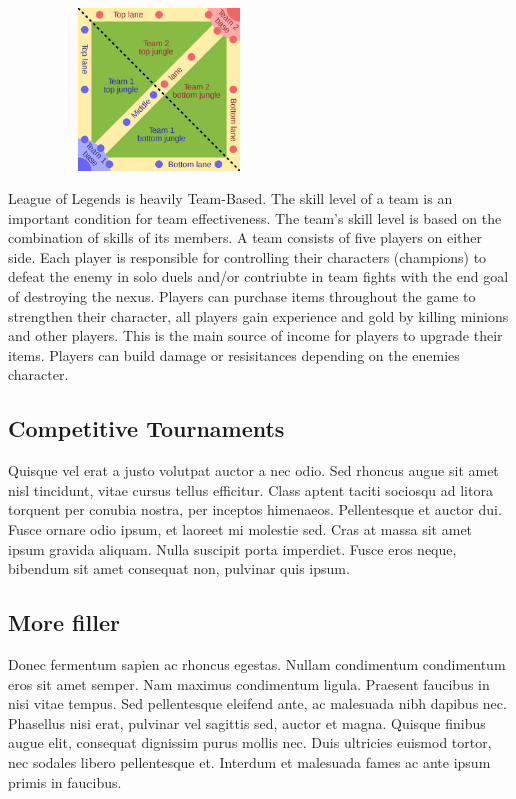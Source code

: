 \begin{center}    
	\includegraphics[width=8cm,height=4.3cm,keepaspectratio]{img/Map.png}
\end{center}
\clearpage

League of Legends is heavily Team-Based. The skill level of a team is an important condition for team effectiveness. The team's skill level is based on the combination of skills of its members.
A team consists of five players on either side. Each player is responsible for controlling their characters (champions) to defeat the enemy in solo duels and/or contriubte in team fights with the end goal of destroying the nexus. Players can purchase items throughout the game to strengthen their character, all players gain experience and gold by killing minions and other players. This is the main source of income for players to upgrade their items. Players can build damage or resisitances depending on the enemies character.

\subsection{Competitive Tournaments}
Quisque vel erat a justo volutpat auctor a nec odio. Sed rhoncus augue sit amet nisl tincidunt, vitae cursus tellus efficitur. Class aptent taciti sociosqu ad litora torquent per conubia nostra, per inceptos himenaeos. Pellentesque et auctor dui. Fusce ornare odio ipsum, et laoreet mi molestie sed. Cras at massa sit amet ipsum gravida aliquam. Nulla suscipit porta imperdiet. Fusce eros neque, bibendum sit amet consequat non, pulvinar quis ipsum.

\subsection{More filler}
Donec fermentum sapien ac rhoncus egestas. Nullam condimentum condimentum eros sit amet semper. Nam maximus condimentum ligula. Praesent faucibus in nisi vitae tempus. Sed pellentesque eleifend ante, ac malesuada nibh dapibus nec. Phasellus nisi erat, pulvinar vel sagittis sed, auctor et magna. Quisque finibus augue elit, consequat dignissim purus mollis nec. Duis ultricies euismod tortor, nec sodales libero pellentesque et. Interdum et malesuada fames ac ante ipsum primis in faucibus.


